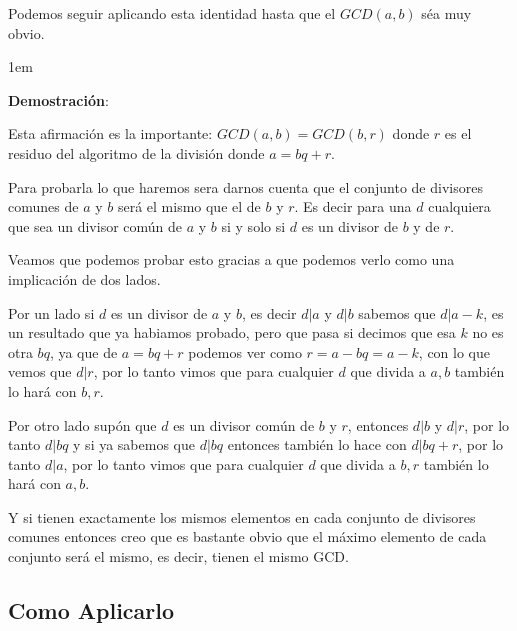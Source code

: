 \documentclass[12pt, fleqn]{report}                             %
\newenvironment{SmallIndentation}[1][0.75em]                    %
    {\begin{adjustwidth}{#1}{}\begin{footnotesize}}                 %
    {\end{footnotesize}\end{adjustwidth}}                           %
\begin{document}
            Podemos seguir aplicando esta identidad hasta que el $GCD(a, b)$ séa muy
            obvio.


        \begin{SmallIndentation}[1em]
            \textbf{Demostración}:

            Esta afirmación es la importante: $GCD(a,b) = GCD(b,r)$ donde $r$ es el residuo
            del algoritmo de la división donde $a=bq+r$.

            Para probarla lo que haremos sera darnos cuenta que el conjunto de divisores
            comunes de $a$ y $b$ será el mismo que el de $b$ y $r$.
            Es decir para una $d$ cualquiera que sea un divisor común de $a$ y $b$ si y solo si
            $d$ es un divisor de $b$ y de $r$.

            Veamos que podemos probar esto gracias a que podemos verlo como una implicación de
            dos lados.

            Por un lado si $d$ es un divisor de $a$ y $b$, es decir $d|a$ y $d|b$
            sabemos que $d|a-k$, es un resultado que ya habiamos probado, pero que
            pasa si decimos que esa $k$ no es otra $bq$, ya que de $a=bq+r$ podemos 
            ver como $r=a-bq = a-k$, con lo que vemos que $d|r$, por lo tanto
            vimos que para cualquier $d$ que divida a $a,b$ también lo hará con $b,r$.

            Por otro lado supón que $d$ es un divisor común de $b$ y $r$, entonces
            $d|b$ y $d|r$, por lo tanto $d|bq$ y si ya sabemos que $d|bq$ entonces
            también lo hace con $d|bq+r$, por lo tanto $d|a$, por lo tanto
            vimos que para cualquier $d$ que divida a $b,r$ también lo hará con $a,b$.

            Y si tienen exactamente los mismos elementos en cada conjunto de divisores
            comunes entonces creo que es bastante obvio que el máximo elemento de cada
            conjunto será el mismo, es decir, tienen el mismo GCD.

        \end{SmallIndentation}


        \clearpage
        \subsection{Como Aplicarlo}
\end{document}
